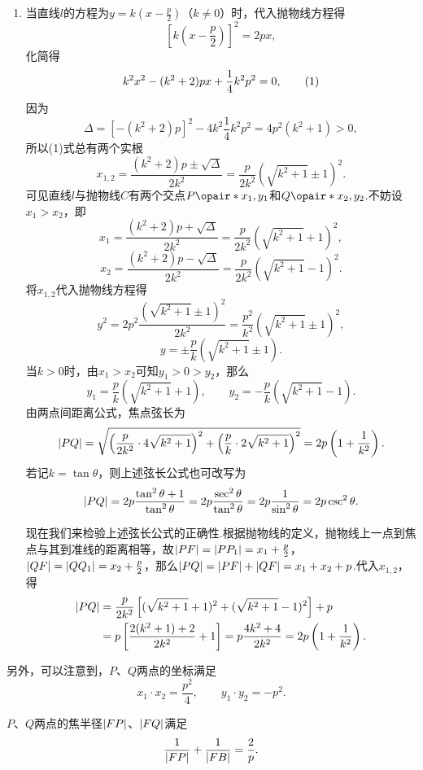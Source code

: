 \begin{example}
\begin{enumerate}
\item 当直线\(l\)的方程为\(y=k\left(x-\frac{p}{2}\right)\)（\(k\neq0\)）时，代入抛物线方程得\[
\left[k \left(x-\frac{p}{2}\right)\right]^2 = 2px,
\]化简得\begin{gather}
k^2 x^2 - (k^2 + 2)px + \frac{1}{4} k^2 p^2 = 0, \tag1
\end{gather}因为\[
\Delta = [- (k^2 + 2)p]^2 - 4 k^2 \frac{1}{4} k^2 p^2
= 4 p^2 (k^2 + 1) > 0,
\]所以(1)式总有两个实根\[
x_{1,2} = \frac{(k^2+2)p \pm \sqrt\Delta}{2 k^2}
= \frac{p}{2 k^2} (\sqrt{k^2+1} \pm 1)^2.
\]可见直线\(l\)与抛物线\(C\)有两个交点\(P\opair*{x_1,y_1}\)和\(Q\opair*{x_2,y_2}\).不妨设\(x_1 > x_2\)，即\[
x_1 = \frac{(k^2+2)p + \sqrt\Delta}{2 k^2}
= \frac{p}{2 k^2} (\sqrt{k^2+1} + 1)^2,
\]\[
x_2 = \frac{(k^2+2)p - \sqrt\Delta}{2 k^2}
= \frac{p}{2 k^2} (\sqrt{k^2+1} - 1)^2.
\]将\(x_{1,2}\)代入抛物线方程得\[
y^2 = 2 p^2 \frac{(\sqrt{k^2+1}\pm1)^2}{2 k^2}
= \frac{p^2}{k^2} (\sqrt{k^2+1}\pm1)^2,
\]\[
y = \pm \frac{p}{k} (\sqrt{k^2+1}\pm1).
\]当\(k>0\)时，由\(x_1 > x_2\)可知\(y_1 > 0 > y_2\)，那么\[
y_1 = \frac{p}{k} (\sqrt{k^2+1}+1),
\qquad
y_2 = -\frac{p}{k} (\sqrt{k^2+1}-1).
\]
由两点间距离公式，焦点弦长为\begin{equation}
\abs{PQ} = \sqrt{
\left(\frac{p}{2 k^2} \cdot 4 \sqrt{k^2+1}\right)^2
+\left(\frac{p}{k} \cdot 2 \sqrt{k^2+1}\right)^2
} = 2p \left(1+\frac{1}{k^2}\right).
\end{equation}若记\(k=\tan\theta\)，则上述弦长公式也可改写为\begin{equation}
\abs{PQ} = 2p \frac{\tan^2\theta+1}{\tan^2\theta}
= 2p \frac{\sec^2\theta}{\tan^2\theta}
= 2p \frac{1}{\sin^2\theta}
= 2p \csc^2\theta.
\end{equation}

现在我们来检验上述弦长公式的正确性.根据抛物线的定义，抛物线上一点到焦点与其到准线的距离相等，故\(\abs{PF} = \abs{P P_1} = x_1 + \frac{p}{2}\)，\(\abs{QF} = \abs{Q Q_1} = x_2 + \frac{p}{2}\)，那么\(\abs{PQ} = \abs{PF}+\abs{QF} = x_1 + x_2 + p\).代入\(x_{1,2}\)，得\begin{align*}
\abs{PQ} &= \frac{p}{2 k^2} \left[(\sqrt{k^2+1} + 1)^2 + (\sqrt{k^2+1} - 1)^2\right] + p \\
&= p\left[\frac{2(k^2 + 1) + 2}{2 k^2} + 1\right]
= p \frac{4k^2 + 4}{2k^2}
= 2p \left(1+\frac{1}{k^2}\right).
\end{align*}
\end{enumerate}

另外，可以注意到，\(P\)、\(Q\)两点的坐标满足\begin{equation}
x_1 \cdot x_2 = \frac{p^2}{4},
\qquad
y_1 \cdot y_2 = -p^2.
\end{equation}

\(P\)、\(Q\)两点的焦半径\(\abs{FP}\)、\(\abs{FQ}\)满足\begin{equation}
\frac{1}{\abs{FP}} + \frac{1}{\abs{FB}}
= \frac{2}{p}.
\end{equation}
\end{example}

